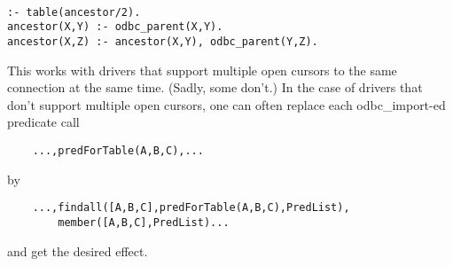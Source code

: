 \begin{verbatim}

:- table(ancestor/2).
ancestor(X,Y) :- odbc_parent(X,Y).
ancestor(X,Z) :- ancestor(X,Y), odbc_parent(Y,Z).
\end{verbatim}

This works with drivers that support multiple open cursors to the same
connection at the same time.  (Sadly, some don't.)  In the case of
drivers that don't support multiple open cursors, one can often
replace each odbc\_import-ed predicate call
\begin{verbatim}
    ...,predForTable(A,B,C),...
\end{verbatim}
by
\begin{verbatim}
    ...,findall([A,B,C],predForTable(A,B,C),PredList),
        member([A,B,C],PredList)...
\end{verbatim}
and get the desired effect.


